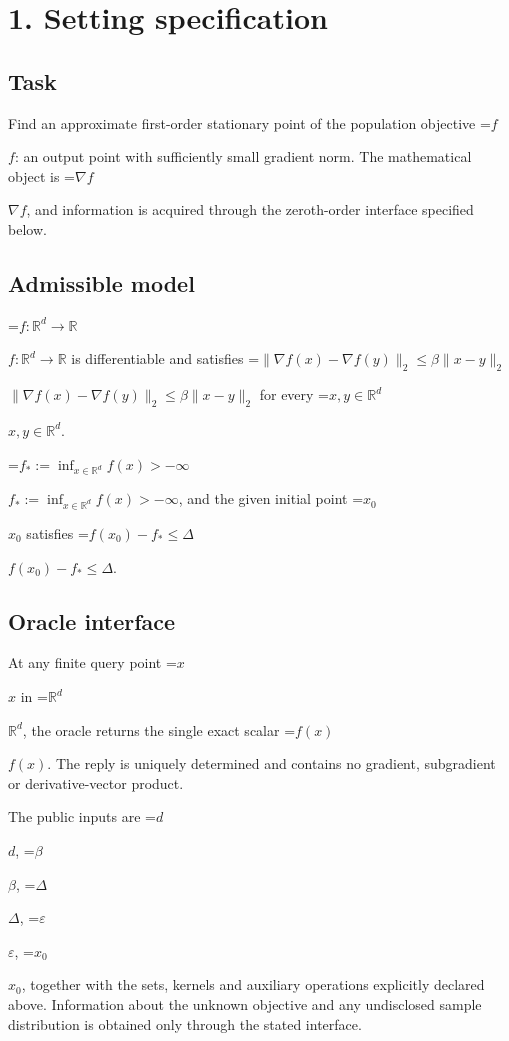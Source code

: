 \documentclass[10pt,a4paper]{article}
\newcommand{\AtlasMath}[1]{\par\begingroup\centering\setbox0=\hbox{$\displaystyle #1$}\ifdim\wd0>1.4\linewidth\typeout{ATLAS WIDE FORMULA: \the\wd0}\fi\ifdim\wd0>\linewidth\resizebox{\linewidth}{!}{\box0}\else\box0\fi\par\endgroup}
\newcommand{\AtlasInlineMath}[1]{\begingroup\setbox0=\hbox{$#1$}\ifdim\wd0>.4\linewidth\endgroup\AtlasMath{#1}\else\endgroup$#1$\fi}
\begin{document}
\section{1. Setting specification}


\subsection{Task}


Find an approximate first-order stationary point of the population objective \AtlasInlineMath{f}: an output point with sufficiently small gradient norm. The mathematical object is \AtlasInlineMath{\nabla f}, and information is acquired through the zeroth-order interface specified below.



\subsection{Admissible model}


\AtlasInlineMath{f:\mathbb{R}^d\to\mathbb{R}} is differentiable and satisfies \AtlasInlineMath{\|\nabla f(x)-\nabla f(y)\|_2\le\beta\|x-y\|_2} for every \AtlasInlineMath{x,y\in\mathbb{R}^d}.



\AtlasInlineMath{f_*:=\inf_{x\in\mathbb{R}^d}f(x)>-\infty}, and the given initial point \AtlasInlineMath{x_0} satisfies \AtlasInlineMath{f(x_0)-f_*\le\Delta}.



\subsection{Oracle interface}


At any finite query point \AtlasInlineMath{x} in \AtlasInlineMath{\mathbb{R}^d}, the oracle returns the single exact scalar \AtlasInlineMath{f(x)}. The reply is uniquely determined and contains no gradient, subgradient or derivative-vector product.



The public inputs are \AtlasInlineMath{d}, \AtlasInlineMath{\beta}, \AtlasInlineMath{\Delta}, \AtlasInlineMath{\varepsilon}, \AtlasInlineMath{x_0}, together with the sets, kernels and auxiliary operations explicitly declared above. Information about the unknown objective and any undisclosed sample distribution is obtained only through the stated interface.
\end{document}

